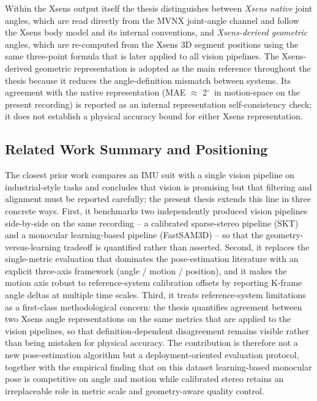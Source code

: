 \documentclass[12pt,a4paper]{article}
\newcommand{\degr}{\ensuremath{^\circ}}
\begin{document}
Within the Xsens output itself the thesis distinguishes between
\emph{Xsens native} joint angles, which are read directly from the MVNX
joint-angle channel and follow the Xsens body model and its internal
conventions, and \emph{Xsens-derived geometric} angles, which are
re-computed from the Xsens 3D segment positions using the same three-point
formula that is later applied to all vision pipelines.
The Xsens-derived geometric representation is adopted as the main reference
throughout the thesis because it reduces the angle-definition mismatch
between systems.  Its agreement with the native representation
(MAE $\approx$ 2\degr\ in motion-space on the present recording) is reported
as an internal representation self-consistency check; it does not establish
a physical accuracy bound for either Xsens representation.

\subsection{Related Work Summary and Positioning}

The closest prior work compares an IMU suit with a single vision pipeline
on industrial-style tasks \cite{quesada2026supporting} and concludes that
vision is promising but that filtering and alignment must be reported
carefully; the present thesis extends this line in three concrete ways.
First, it benchmarks two independently produced vision pipelines
side-by-side on the same recording -- a calibrated sparse-stereo pipeline
(SKT) and a monocular learning-based pipeline (FastSAM3D) -- so that the
geometry-versus-learning tradeoff is quantified rather than asserted.
Second, it replaces the single-metric evaluation that dominates the
pose-estimation literature with an explicit three-axis framework
(angle / motion / position), and it makes the motion axis robust to
reference-system calibration offsets by reporting K-frame angle deltas at
multiple time scales.
Third, it treats reference-system limitations as a first-class methodological
concern: the thesis quantifies agreement between two Xsens angle
representations on the same metrics that are applied to the vision
pipelines, so that definition-dependent disagreement remains visible rather
than being mistaken for physical accuracy.
The contribution is therefore not a new pose-estimation algorithm but a
deployment-oriented evaluation protocol, together with the empirical finding
that on this dataset learning-based monocular pose is competitive on angle
and motion while calibrated stereo retains an irreplaceable role in metric
scale and geometry-aware quality control.
\end{document}

